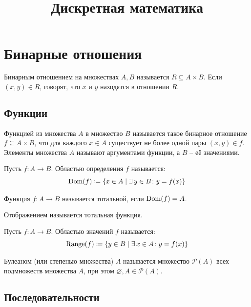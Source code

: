 \documentclass[12pt]{article}
\title{\textbf{Дискретная математика}}\date{}\author{}
\begin{document}
\maketitle
\tableofcontents
\label{toc}
\newpage

\section{Бинарные отношения}

\begin{definition}
	Бинарным отношением на множествах $A, B$ называется $R\subseteq
	A\times B$. Если $(x,y)\in R$, говорят, что $x$ и $y$ находятся в
	отношении $R$.
\end{definition}

\subsection{Функции}

\begin{definition}
	Функцией из множества $A$ в множество $B$ называется такое бинарное
	отношение $f \subseteq A\times B$, что для каждого $x\in A$
	существует не более одной пары $(x, y)\in f$. Элементы множества $A$
	называют аргументами функции, а $B$ -- её значениями.
\end{definition}
\begin{definition}
	Пусть $f\colon A\to B$. Областью определения $f$ называется:
	\[\operatorname{Dom}(f)\coloneqq\{x\in A\mid \exists\, y\in B\colon y=f(x)\}\]
\end{definition}
\begin{definition}
	Функция $f\colon A\to B$ называется тотальной, если $\operatorname{Dom}(f)=A$.
\end{definition}
\begin{definition}
	Отображением называется тотальная функция.
\end{definition}
\begin{definition}
	Пусть $f\colon A\to B$. Областью значений $f$ называется:
	\[\operatorname{Range}(f)\coloneqq \{y\in B\mid \exists\, x\in A\colon y=f(x)\}\]
\end{definition}
\begin{definition}
	Булеаном (или степенью множества) $A$ называется множество
	$\mathcal{P}(A)$ всех подмножеств множества $A$, при этом
	$\varnothing, A\in \mathcal{P}(A)$.
\end{definition}

\subsection{Последовательности}
\end{document}
